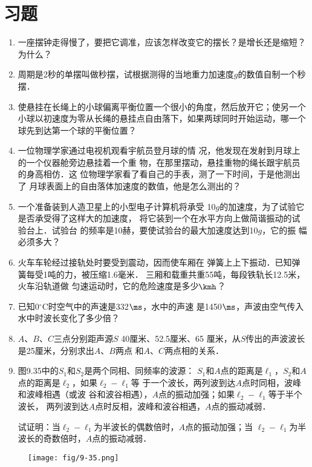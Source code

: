 \section*{习题}
\begin{enumerate}
    \item 一座摆钟走得慢了，要把它调准，应该怎样改变它的摆长？是增长还是缩短？为什么？
    \item 周期是2秒的单摆叫做秒摆，试根据测得的当地重力加速度$g$的数值自制一个秒摆．
    \item 使悬挂在长绳上的小球偏离平衡位置一个很小的角度，然后放开它；使另一个小球以初速度为零从长绳的悬挂点自由落下，如果两球同时开始运动，哪一个球先到达第一个球的平衡位置？
    \item 一位物理学家通过电视机观看宇航员登月球的情
况，他发现在发射到月球上的一个仪器舱旁边悬挂着一个重
物，在那里摆动，悬挂重物的绳长跟宇航员的身高相仿．这
位物理学家看了看自己的手表，测了一下时间，于是他测出了
月球表面上的自由落体加速度的数值，他是怎么测出的？
\item 一个准备装到人造卫星上的小型电子计算机将承受
10$g$的加速度，为了试验它是否承受得了这样大的加速度，
将它装到一个在水平方向上做简谐振动的试验台上．试验台
的频率是10赫，要使试验台的最大加速度达到10$g$，它的振
幅必须多大？
\item 火车车轮经过接轨处时要受到震动，因而使车厢在
弹簧上上下振动．已知弹簧每受1吨的力，被压缩1.6毫米．
三厢和载重共重55吨，每段铁轨长12.5米，火车沿轨道做
匀速运动时，它的危险速度是多少$\kmh$？
\item 已知0$^{\circ}$C时空气中的声速是332$\ms$，水中的声速
是1450$\ms$，声波由空气传入水中时波长变化了多少倍？
\item $A$、$B$、$C$三点分别距声源$S$ 40厘米、52.5厘米、65
厘米，从$S$传出的声波波长是25厘米，分别求出$A$、$B$两点
和$A$、$C$两点相的关系．
\item 图9.35中的$S_1$和$S_2$是两个同相、同频率的波源：
$S_1$和$A$点的距离是$\ell_1$，$S_2$和$A$点的距离是$\ell_2$，如果$\ell_2-\ell_1$等
于一个波长，两列波到达$A$点时同相，波峰和波峰相遇（或波
谷和波谷相遇），$A$点的振动加强；如果$\ell_2-\ell_1$等于半个波长，
两列波到达$A$点时反相，波峰和波谷相遇，$A$点的振动减弱．

试证明：当$\ell_2-\ell_1$为半波长的偶数倍时，$A$点的振动加强；当
$\ell_2-\ell_1$为半波长的奇数倍时，$A$点的振动减弱．
\end{enumerate}

\begin{figure}[htp]\centering
    \texttt{[image: fig/9-35.png]}
    \caption{}
    \end{figure}

























